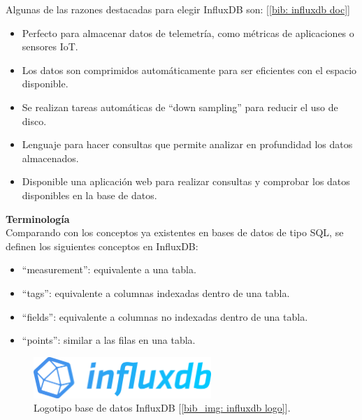 \documentclass[a4paper, oneside, 12pt]{book}
\begin{document}
	\noindent Algunas de las razones destacadas para elegir InfluxDB son: [\ref{bib: influxdb doc}]
	
	\begin{itemize}
		\item Perfecto para almacenar datos de telemetría, como métricas de aplicaciones o sensores IoT.
		\item Los datos son comprimidos automáticamente para ser eficientes con el espacio disponible.
		\item Se realizan tareas automáticas de ``down sampling'' para reducir el uso de disco.
		\item Lenguaje para hacer consultas que permite analizar en profundidad los datos almacenados.
		\item Disponible una aplicación web para realizar consultas y comprobar los datos disponibles en la base de datos.
	\end{itemize}

	\vspace{10px}

	\noindent \textbf{\large Terminología} \\
	
	\noindent Comparando con los conceptos ya existentes en bases de datos de tipo SQL, se definen los siguientes conceptos en InfluxDB:
	
	\begin{itemize}
		\item ``measurement'': equivalente a una tabla.
		\item ``tags'': equivalente a columnas indexadas dentro de una tabla.
		\item ``fields'': equivalente a columnas no indexadas dentro de una tabla.
		\item ``points'': similar a las filas en una tabla.
	\end{itemize}

	\vspace{20px}

	\begin{figure}[h!]
		\begin{center}
			\includegraphics[width=0.6\textwidth]{img/InfluxDB.png}
			\caption{Logotipo base de datos InfluxDB [\ref{bib_img: influxdb logo}].}
			\label{img: influxdb logo}
		\end{center}
	\end{figure}
	
\end{document}
